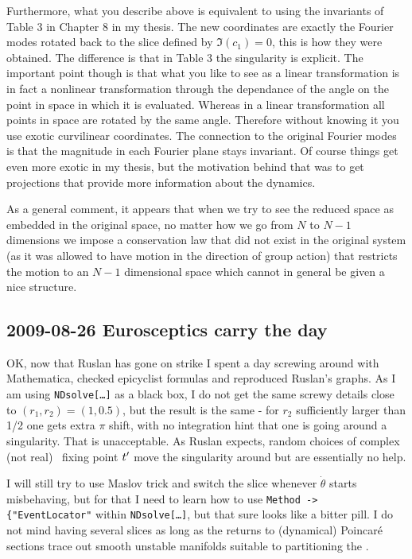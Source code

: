 Furthermore, what you describe above is equivalent to using
the invariants of Table 3 in Chapter 8 in my thesis. The new
coordinates are exactly the Fourier modes rotated back to the
slice defined by $\Im(c_1)=0$, this is how they were
obtained. The difference is that in Table 3 the singularity
is explicit. The important point though is that what you like
to see as a linear transformation is in fact a nonlinear
transformation through the dependance of the angle on the
point in space in which it is evaluated. Whereas in a linear
transformation all points in space are rotated by the same
angle. Therefore without knowing it you use exotic
curvilinear coordinates. The connection to the original
Fourier modes is that the magnitude in each Fourier plane
stays invariant. Of course things get even more exotic in my
thesis, but the motivation behind that was to get projections
that provide more information about the dynamics.

As a general comment, it appears that when we try to see the
reduced space as embedded in the original space, no matter
how we go from $N$ to $N-1$ dimensions we impose a
conservation law that did not exist in the original system
(as it was allowed to have motion in the direction of group
action) that restricts the motion to an $N-1$ dimensional
space which cannot in general be given a nice structure.

\subsection{2009-08-26 Eurosceptics carry the day}
\label{sect:2009-08-26}

 OK, now that Ruslan has gone on
strike I spent a day screwing around with Mathematica,
checked epicyclist formulas and reproduced Ruslan's graphs.
As I am using \texttt{NDsolve[\dots]} as a black box, I do
not get the same screwy details close to $(r_1,r_2)=(1,0.5)$,
but the result is the same - for $r_2$ sufficiently larger
than 1/2 one gets extra $\pi$ shift, with no integration hint
that one is going around a singularity. That is unacceptable.
As Ruslan expects,
random choices of complex (not real) \slice\ fixing
point $t'_{}$ move the singularity around but are essentially no
help.

I will still try to use Maslov trick and switch the slice
whenever $\dot{\theta}$ starts misbehaving, but for that I
need to learn how to use \texttt{Method -> \{"EventLocator"}
within \texttt{NDsolve[\dots]}, but that sure looks like a
bitter pill. I do not mind having several slices as long as
the returns to (dynamical) Poincar\'e sections trace out
smooth unstable manifolds suitable to partitioning the
\reducedsp.

